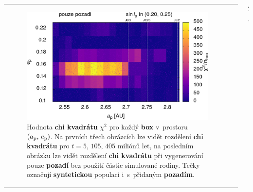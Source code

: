 \documentclass{beamer}
\newlength{\sep}
\newlength{\vyska}
\newlength{\vyskaB}
\newlength{\main}
\begin{document}
\begin{frame}
\begin{columns}[t]
\begin{column}{\main}
\begin{tcolorbox}[title=Výsledky\phantom{Úy},height=\vyskaB]
\begin{tabularx}{\textwidth}{p{}p{}}
\begin{figure}
		\includegraphics[width=\chiwidth]{../obr/ae_chi_emptyt_trans.png}
		\caption{Hodnota \textbf{chi kvadrátu} $\chi^2$ pro každý \textbf{box} v~prostoru $(a_{\rm p},\,e_{\rm p})$. Na prvních třech obrázcích lze vidět rozdělení \textbf{chi kvadrátu} pro $t=5,\,105,\,405$ miliónů let, na posledním obrázku lze vidět rozdělení \textbf{chi kvadrátu} při vygenerování pouze \textbf{pozadí} bez použití částic simulované rodiny. Tečky označují \textbf{syntetickou} populaci i~s~přidaným \textbf{pozadím}.} \label{fig:ae_chi2}
	\end{figure}\end{tabularx}
\end{tcolorbox}
\vspace{\sep}
\end{column}

\begin{column}{2\sep}
\end{column}


\end{columns}
\end{frame}
\end{document}
